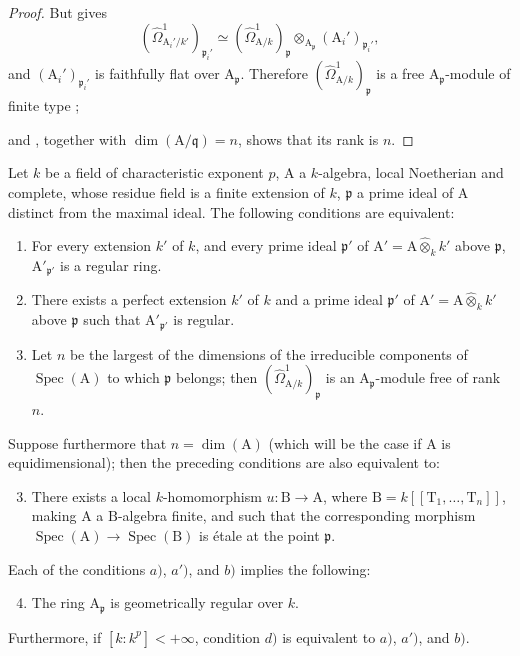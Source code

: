 \begin{proof}
But  gives
\[
  (\hat{\Omega}^1_{\mathrm{A}_i'/k'})_{\mathfrak p_i'}
  \simeq (\hat{\Omega}^1_{\mathrm{A}/k})_\mathfrak p
  \otimes_{\mathrm{A}_\mathfrak p}(\mathrm{A}_i')_{\mathfrak p_i'},
\]
and $(\mathrm{A}_i')_{\mathfrak p_i'}$ is faithfully flat over $\mathrm{A}_\mathfrak p$. Therefore $(\hat{\Omega}^1_{\mathrm{A}/k})_\mathfrak p$ is a free $\mathrm{A}_\mathfrak p$-module of finite type ;


and , together with $\dim(\mathrm{A}/\mathfrak q)=n$, shows that its rank is $n$.
\end{proof}

\begin{theorem}[18.11.10]
\label{IV.18.11.10}
Let $k$ be a field of characteristic exponent $p$, $\mathrm{A}$ a $k$-algebra, local Noetherian and complete, whose residue field is a finite extension of $k$, $\mathfrak{p}$ a prime ideal of $\mathrm{A}$ distinct from the maximal ideal.
The following conditions are equivalent:
\begin{enumerate}[label=\alph*)]
  \item For every extension $k'$ of $k$, and every prime ideal $\mathfrak{p}'$ of $\mathrm{A}'=\mathrm{A}\widehat{\otimes}_kk'$ above $\mathfrak{p}$, $\mathrm{A}'_{\mathfrak{p}'}$ is a regular ring.
\item[a$'$)] There exists a perfect extension $k'$ of $k$ and a prime ideal $\mathfrak{p}'$ of $\mathrm{A}'=\mathrm{A}\widehat{\otimes}_kk'$ above $\mathfrak{p}$ such that $\mathrm{A}'_{\mathfrak{p}'}$ is regular.
  \item Let $n$ be the largest of the dimensions of the irreducible components of $\operatorname{Spec}(\mathrm{A})$ to which $\mathfrak{p}$ belongs; then $(\hat{\Omega}^1_{\mathrm{A}/k})_\mathfrak{p}$ is an $\mathrm{A}_\mathfrak{p}$-module free of rank $n$.
\end{enumerate}
Suppose furthermore that $n=\dim(\mathrm{A})$ (which will be the case if $\mathrm{A}$ is equidimensional); then the preceding conditions are also equivalent to:
\begin{enumerate}[label=\alph*)]
  \setcounter{enumi}{2}
  \item There exists a local $k$-homomorphism $u:\mathrm{B}\to\mathrm{A}$, where $\mathrm{B}=k[[\mathrm{T}_1,\ldots,\mathrm{T}_n]]$, making $\mathrm{A}$ a $\mathrm{B}$-algebra finite, and such that the corresponding morphism $\operatorname{Spec}(\mathrm{A})\to\operatorname{Spec}(\mathrm{B})$ is \'etale at the point $\mathfrak{p}$.
\end{enumerate}
Each of the conditions $a)$, $a')$, and $b)$ implies the following:
\begin{enumerate}[label=\alph*)]
  \setcounter{enumi}{3}
  \item The ring $\mathrm{A}_\mathfrak{p}$ is geometrically regular over $k$.
\end{enumerate}
Furthermore, if $[k:k^p]<+\infty$, condition $d)$ is equivalent to $a)$, $a')$, and $b)$.
\end{theorem}

